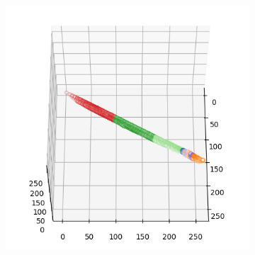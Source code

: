 \begin{figure}[htbp]
\begin{subfigure}[t]{0.32\textwidth}
    \end{subfigure}
    \begin{subfigure}[t]{0.32\textwidth}
        \includegraphics[width=\linewidth]{../../python_code/plots/kmeans/horse-137/clusters_elev60_azim0.png}
    \end{subfigure}
\end{figure}

